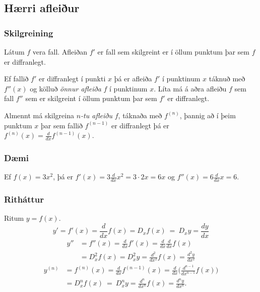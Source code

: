 \documentclass[icelandic,a4paper,12pt]{article}
\begin{document}
\subsection{Hærri afleiður}
\subsubsection{Skilgreining}  
Látum $f$ vera fall.  Afleiðan $f'$ er fall
sem skilgreint er í öllum punktum þar sem $f$ er diffranlegt.  

\pause

Ef fallið $f'$ er diffranlegt í punkti $x$ þá er afleiða $f'$ í
punktinum $x$ táknuð með $f''(x)$ og kölluð \emph{önnur afleiða} $f$ 
í punktinum $x$.  \pause
Líta má á aðra afleiðu $f$ sem fall $f''$ sem 
er skilgreint í öllum punktum þar sem $f'$ er diffranlegt.

\pause

Almennt má skilgreina $n$\emph{-tu afleiðu} $f$, táknaða með $f^{(n)}$, 
þannig að í þeim punktum $x$ þar sem fallið $f^{(n-1)}$ er diffranlegt 
þá er $f^{(n)}(x)=\frac{d}{dx}f^{(n-1)}(x)$.  
 

\subsubsection{Dæmi}
Ef $f(x)  = 3x^2$, þá er $f'(x) = 3\frac{d}{dx}x^2 = 3\cdot 2x = 6x$ og 
$f''(x) = 6 \frac{d}{dx} x = 6$.

\subsubsection{Ritháttur}   
Ritum $y=f(x)$.  
\begin{equation*}
y'= f'(x)=\frac{d}{dx}f(x)=D_xf(x)\ =\ D_x y= \frac{dy}{dx}
\end{equation*}\pause
\begin{align*}
y'' &=
f''(x)=\frac{d}{dx}f'(x)=\frac{d}{dx}\frac{d}{dx}f(x)\\
&= D^2_xf(x)= D^2_x y=\frac{d^2}{dx^2}f(x)=\frac{d^2 y}{dx^2}
\end{align*}\pause
\begin{align*}
y^{(n)} &= f^{(n)}(x)=\frac{d}{dx}f^{(n-1)}(x)=
\frac{d}{dx}\Big(\frac{d^{n-1}}{dx^{n-1}}f(x)\Big) \\
&=D^n_xf(x)\ =\ D^n_x y
=\frac{d^n}{dx^n}f(x)
= \frac{d^n y}{dx^n}.
\end{align*}
\end{document}
